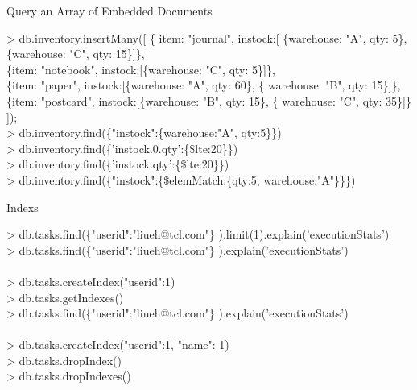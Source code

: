 \documentclass{beamer}
\begin{document}
\begin{frame}{Query an Array of Embedded Documents}
\scriptsize
\begin{Alms*}
	> db.inventory.insertMany([\NI
	\{ item: "journal", instock:[\NI
		\{warehouse: "A", qty: 5\}, \{warehouse: "C", qty: 15\}\ND]\},\\
	\{item: "notebook", instock:[\NI\{warehouse: "C", qty: 5\}\ND]\},\\
	\{item: "paper", instock:[\NI\{warehouse: "A", qty: 60\}, \{ warehouse: "B", qty: 15\}\ND]\},\\
	\{item: "postcard", instock:[\NI\{warehouse: "B", qty: 15\}, \{ warehouse: "C", qty: 35\}\ND]\}
	\ND]);\\
	> db.inventory.find(\{"instock":\{warehouse:"A", qty:5\}\})\\
	> db.inventory.find(\{'instock.0.qty':\{\$lte:20\}\})\\
	> db.inventory.find(\{'instock.qty':\{\$lte:20\}\})\\
	> db.inventory.find(\{"instock":\{\$elemMatch:\{qty:5, warehouse:"A"\}\}\})
\end{Alms*}
\end{frame}

\begin{frame}{Indexs}
	\scriptsize
	\begin{Alms*}
		> db.tasks.find(\NI\{"userid":"liueh@tcl.com"\}
		\ND).limit(1).explain('executionStats') \\
		> db.tasks.find(\NI\{"userid":"liueh@tcl.com"\}
		\ND).explain('executionStats') \\
		\\
		> db.tasks.createIndex({"userid":1}) \\
		> db.tasks.getIndexes() \\
		> db.tasks.find(\NI\{"userid":"liueh@tcl.com"\}
		\ND).explain('executionStats') \\
		\\
		> db.tasks.createIndex({"userid":1, "name":-1}) \\
		> db.tasks.dropIndex() \\
		> db.tasks.dropIndexes()
	\end{Alms*}
\end{frame}
\end{document}
